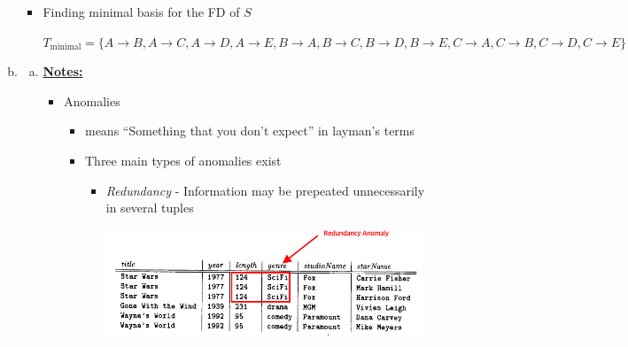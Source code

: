 \documentclass[12pt]{article}
\begin{document}
\begin{enumerate}[1.]
\begin{enumerate}[a)]
\begin{itemize}
            \item Finding minimal basis for the FD of $S$

            $T_{\text{minimal}} = \{
                    A \to B,
                    A \to C,
                    A \to D,
                    A \to E,
                    B \to A,
                    B \to C,
                    B \to D,
                    B \to E,
                    C \to A,
                    C \to B,
                    C \to D,
                    C \to E
            \}$

        \end{itemize}

        \item

        \begin{enumerate}[a)]

            \item

            \bigskip

            \underline{\textbf{Notes:}}

            \bigskip

            \begin{itemize}
                \item Anomalies
                \begin{itemize}
                    \item means ``Something that you don't expect'' in layman's terms
                    \item Three main types of anomalies exist
                    \begin{itemize}
                        \item \textit{Redundancy} - Information may be prepeated unnecessarily in several tuples

                        \bigskip

                        \begin{center}
                        \includegraphics[width=0.7\linewidth]{images/worksheet_12_solution_3.png}
                        \end{center}


\end{itemize}
\end{itemize}
\end{itemize}
\end{enumerate}
\end{enumerate}
\end{enumerate}
\end{document}
